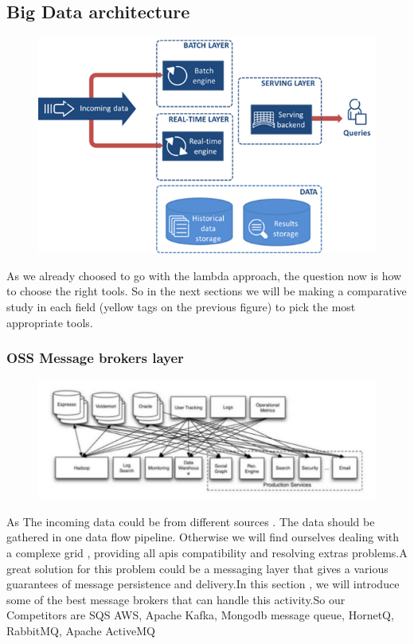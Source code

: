 \subsection{Big Data architecture}
\label{sec:sec01}

\begin{figure}[h!]
	\centering
	\includegraphics[height=0.4\textheight]{fig01/lambda}
	\label{fig:FilialesEtClients}
\end{figure}

As we already choosed to go with the lambda approach, the question now is how to choose the right tools. So in the next sections we will be making a comparative study in each field (yellow tags on the previous figure) to pick the most appropriate tools.

\subsubsection{OSS Message brokers layer}
\label{sec:sec01}
\begin{figure}[h!]
	\centering
	\includegraphics[height=0.2\textheight]{fig01/MessageBrokerNecessity}
	\label{fig:FilialesEtClients}
\end{figure}
As The incoming data could be from different sources . The data should be gathered in one data flow pipeline.
Otherwise we will find ourselves dealing with a complexe grid , providing all apis compatibility and resolving 
extras problems.A great solution for this problem could be a messaging layer that gives a various guarantees 
of message persistence and delivery.In this section , we will introduce some of the best message brokers that can 
handle this activity.So our Competitors are SQS AWS, Apache Kafka, Mongodb message queue, HornetQ, RabbitMQ, 
Apache ActiveMQ

